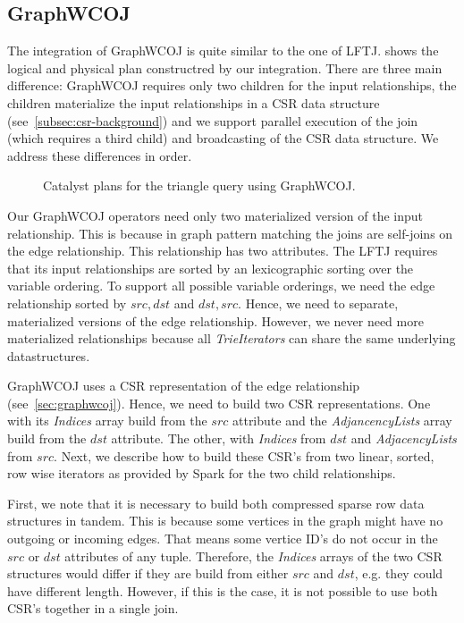 \subsection{GraphWCOJ} \label{subsec:spark-integration-graphWCOJ}
The integration of GraphWCOJ is quite similar to the one of \textsc{LFTJ}.
 shows the logical and physical plan constructred by our integration.
There are three main difference: GraphWCOJ requires only two children for the input relationships, the children materialize the input
relationships in a CSR data structure (see~\cref{subsec:csr-background}) and we support parallel execution of the join (which requires
a third child) and broadcasting of the CSR data structure.
We address these differences in order.

\begin{figure}
    \caption{Catalyst plans for the triangle query using GraphWCOJ.}
    \label{fig:graphWCOJ-catalyst-plan}
\end{figure}

Our GraphWCOJ operators need only two materialized version of the input relationship.
This is because in graph pattern matching the joins are self-joins on the edge relationship.
This relationship has two attributes.
The \textsc{LFTJ} requires that its input relationships are sorted by an lexicographic sorting over the variable ordering.
To support all possible variable orderings, we need the edge relationship sorted by $src, dst$ and $dst, src$.
Hence, we need to separate, materialized versions of the edge relationship.
However, we never need more materialized relationships because all \textit{TrieIterators} can share the same underlying datastructures.

GraphWCOJ uses a CSR representation of the edge relationship (see~\cref{sec:graphwcoj}).
Hence, we need to build two CSR representations.
One with its \textit{Indices} array build from the $src$ attribute and the \textit{AdjancencyLists} array build from the $dst$ attribute.
The other, with \textit{Indices} from $dst$ and \textit{AdjacencyLists} from $src$.
Next, we describe how to build these CSR's from two linear, sorted, row wise iterators as provided by Spark for the two child relationships.

First, we note that it is necessary to build both compressed sparse row data structures in tandem.
This is because some vertices in the graph might have no outgoing or incoming edges.
That means some vertice ID's do not occur in the $src$ or $dst$ attributes of any tuple.
Therefore, the \textit{Indices} arrays of the two CSR structures would differ if they are build from either $src$ and $dst$, e.g.
they could have different length.
However, if this is the case, it is not possible to use both CSR's together in a single join.

